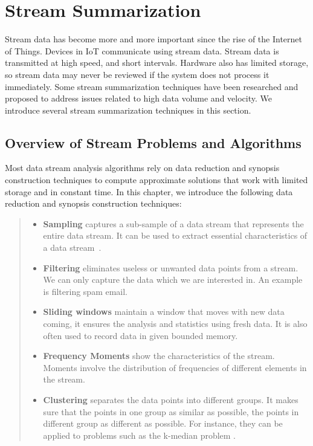 \section{Stream Summarization}

Stream data has become more and more important since the rise of the Internet of
Things. Devices in IoT communicate using stream data. Stream data is transmitted
at high speed, and short intervals. Hardware also has limited storage, so
stream data may never be reviewed if the system does not process it immediately. Some
stream summarization techniques have been researched and proposed to address issues
related to high data volume and
velocity. We introduce several stream summarization techniques in this section.

\subsection{Overview of Stream Problems and Algorithms}
Most data stream analysis algorithms rely on data reduction and synopsis
construction techniques to compute approximate solutions that work with limited
storage and in constant time. In this chapter, we introduce the following data
reduction and synopsis construction techniques:
\begin{quote}
\begin{itemize}
    \item  \textbf{Sampling} captures a sub-sample of a data stream that represents
    the entire data stream. It can be used to extract essential
    characteristics of a data stream~\cite{kejariwal2015real}.
    
    \item \textbf{Filtering} eliminates useless or unwanted data points from a
    stream. We can only capture the data which we are interested in. An
    example is filtering spam email.
    
    \item \textbf{Sliding windows} maintain a window that moves with new data
    coming, it ensures the analysis and statistics using fresh data. It is also 
    often used to record data in given bounded memory.

    \item \textbf{Frequency Moments} show the characteristics of the stream.
    Moments involve the distribution of frequencies of different elements in
    the stream. 

    \item \textbf{Clustering} separates the data points into different groups.
    It makes sure that the points in one
    group as similar as possible, the points in different group as different as
    possible. For instance, they can be applied to problems such as the k-median 
    problem . 

\end{itemize}
\end{quote}

